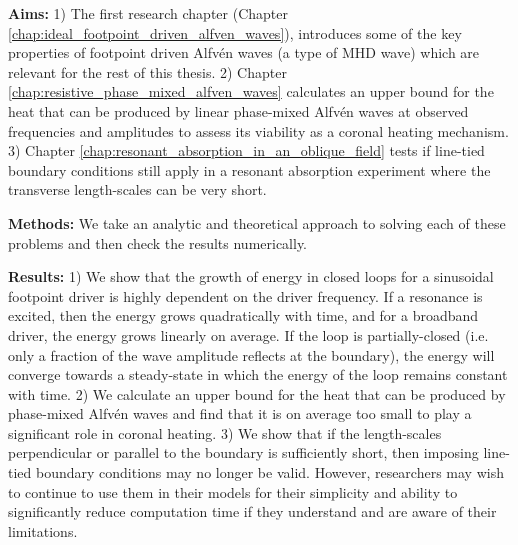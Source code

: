 \begin{spacing}{1.1}
\textbf{Aims:}
1) The first research chapter (Chapter \ref{chap:ideal_footpoint_driven_alfven_waves}), introduces some of the key properties of footpoint driven Alfv\'en waves (a type of MHD wave) which are relevant for the rest of this thesis.
2) Chapter \ref{chap:resistive_phase_mixed_alfven_waves} calculates an upper bound for the heat that can be produced by linear phase-mixed Alfv\'en waves at observed frequencies and amplitudes to assess its viability as a coronal heating mechanism.
3) Chapter \ref{chap:resonant_absorption_in_an_oblique_field} tests if line-tied boundary conditions still apply in a resonant absorption experiment where the transverse length-scales can be very short.

\textbf{Methods:} We take an analytic and theoretical approach to solving each of these problems and then check the results numerically.

\textbf{Results:} 1) We show that the growth of energy in closed loops for a sinusoidal footpoint driver is highly dependent on the driver frequency. If a resonance is excited, then the energy grows quadratically with time, and for a broadband driver, the energy grows linearly on average. If the loop is partially-closed (i.e. only a fraction of the wave amplitude reflects at the boundary), the energy will converge towards a steady-state in which the energy of the loop remains constant with time. 
2) We calculate an upper bound for the heat that can be produced by phase-mixed Alfv\'en waves and find that it is on average too small to play a significant role in coronal heating. 
3) We show that if the length-scales perpendicular or parallel to the boundary is sufficiently short, then imposing line-tied boundary conditions may no longer be valid. However, researchers may wish to continue to use them in their models for their simplicity and ability to significantly reduce computation time if they understand and are aware of their limitations.

\end{spacing}